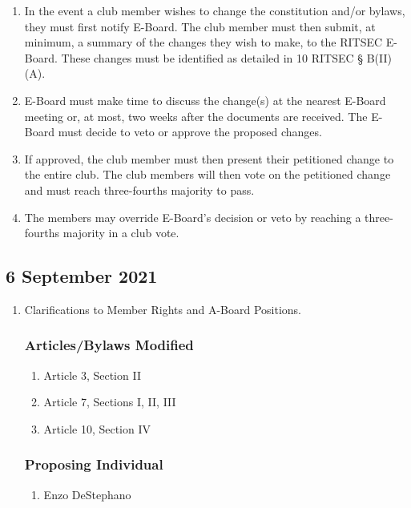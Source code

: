 \begin{enumerate}
  \item In the event a club member wishes to change the constitution and/or
    bylaws, they must first notify E-Board. The club member must then submit, at
    minimum, a summary of the changes they wish to make, to the RITSEC E-Board. 
    These changes must be identified as detailed in 10 RITSEC § B(II)(A).
  \item E-Board must make time to discuss the change(s) at the nearest E-Board
    meeting or, at most, two weeks after the documents are received. The
    E-Board must decide to veto or approve the proposed changes.
  \item If approved, the club member must then present their petitioned change
    to the entire club. The club members will then vote on the petitioned
    change and must reach three-fourths majority to pass.
  \item The members may override E-Board's decision or veto by reaching a
    three-fourths majority in a club vote.
\end{enumerate}

  \subsection{6 September 2021}
  \begin{enumerate}
    \item Clarifications to Member Rights and A-Board Positions.

      \subsubsection{Articles/Bylaws Modified}
      \begin{enumerate}
        \item Article 3, Section II
        \item Article 7, Sections I, II, III
        \item Article 10, Section IV
      \end{enumerate} 

      \subsubsection{Proposing Individual}
      \begin{enumerate}
        \item Enzo DeStephano
      \end{enumerate}
  \end{enumerate}
